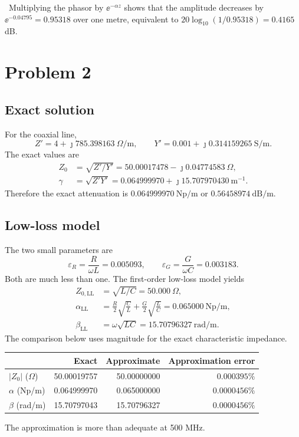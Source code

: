 \documentclass[12pt,a4paper]{article}
\begin{document}
\checkmarktext\ Multiplying the phasor by $\ee^{-\alpha z}$ shows that the
amplitude decreases by $\ee^{-0.04795}=0.95318$ over one metre, equivalent to
$20\log_{10}(1/0.95318)=0.4165$ dB.


\section{Problem 2}

\subsection{Exact solution}

For the coaxial line,
\[
Z'=4+\jmath785.398163~\Omega/\mathrm{m},
\qquad
Y'=0.001+\jmath0.314159265~\mathrm{S/m}.
\]
The exact values are
\begin{align}
Z_0&=\sqrt{Z'/Y'}
=50.00017478-\jmath0.04774583~\Omega,\\
\gamma&=\sqrt{Z'Y'}
=0.064999970+\jmath15.707970430~\mathrm{m}^{-1}.
\end{align}
Therefore the exact attenuation is $0.064999970~\mathrm{Np/m}$ or
$0.56458974~\mathrm{dB/m}$.

\subsection{Low-loss model}

The two small parameters are
\[
\varepsilon_R=\frac{R}{\omega L}=0.005093,
\qquad
\varepsilon_G=\frac{G}{\omega C}=0.003183.
\]
Both are much less than one.  The first-order low-loss model yields
\begin{align}
Z_{0,\mathrm{LL}}&=\sqrt{L/C}=50.000~\Omega,\\
\alpha_{\mathrm{LL}}&=\frac{R}{2}\sqrt{\frac{C}{L}}
+\frac{G}{2}\sqrt{\frac{L}{C}}
=0.065000~\mathrm{Np/m},\\
\beta_{\mathrm{LL}}&=\omega\sqrt{LC}=15.70796327~\mathrm{rad/m}.
\end{align}
The comparison below uses magnitude for the exact characteristic impedance.

\begin{center}
\renewcommand{\arraystretch}{1.22}
\begin{tabular}{lrrr}
\toprule
 & Exact & Approximate & Approximation error \\
\midrule
$|Z_0|$ ($\Omega$) & 50.00019757 & 50.00000000 & $0.000395\%$ \\
$\alpha$ (Np/m) & 0.064999970 & 0.065000000 & $0.0000456\%$ \\
$\beta$ (rad/m) & 15.70797043 & 15.70796327 & $0.0000456\%$ \\
\bottomrule
\end{tabular}
\end{center}
The approximation is more than adequate at 500 MHz.
\end{document}
